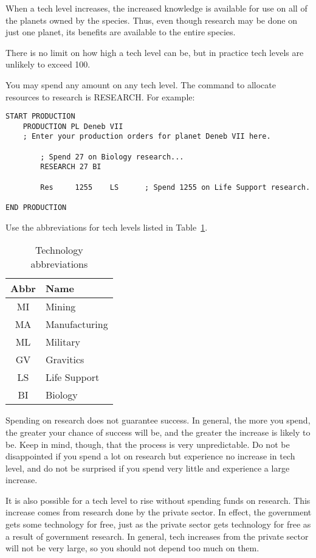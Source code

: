 \documentclass[10pt,titlepage]{article}
\begin{document}
When a tech level increases, the increased knowledge is available for use on
all of the planets owned by the species.  Thus, even though research may be
done on just one planet, its benefits are available to the entire species.

There is no limit on how high a tech level can be, but in practice tech levels
are unlikely to exceed 100.

You may spend any amount on any tech level.  The command to allocate resources
to research is RESEARCH.  For example:

\begin{verbatim}
START PRODUCTION
    PRODUCTION PL Deneb VII
    ; Enter your production orders for planet Deneb VII here.

        ; Spend 27 on Biology research...
        RESEARCH 27 BI

        Res     1255    LS      ; Spend 1255 on Life Support research.

END PRODUCTION
\end{verbatim} 

\noindent Use the abbreviations for tech levels listed in Table~\ref{tab:techabbrvs}.

\begin{table}[h]
\begin{center}
\begin{tabular}{|cl|}
\hline
\rowcolor{lightblue} \textbf{Abbr} &    \textbf{Name}   \\
\hline
	MI	&	Mining \\
	MA	&	Manufacturing \\
	ML	&	Military \\
	GV	&	Gravitics \\
	LS	&	Life Support\\
	BI	&	Biology \\
\hline
\end{tabular}
\caption{Technology abbreviations}
\label{tab:techabbrvs}
\end{center}
\end{table}

Spending on research does not guarantee success.  In general, the more you
spend, the greater your chance of success will be, and the greater the increase
is likely to be.  Keep in mind, though, that the process is very unpredictable.
Do not be disappointed if you spend a lot on research but experience no
increase in tech level, and do not be surprised if you spend very little
and experience a large increase.

It is also possible for a tech level to rise without spending funds on
research.  This increase comes from research done by the private sector.
In effect, the government gets some technology for free, just as the private
sector gets technology for free as a result of government research.  In
general, tech increases from the private sector will not be very large,
so you should not depend too much on them.
\end{document}
